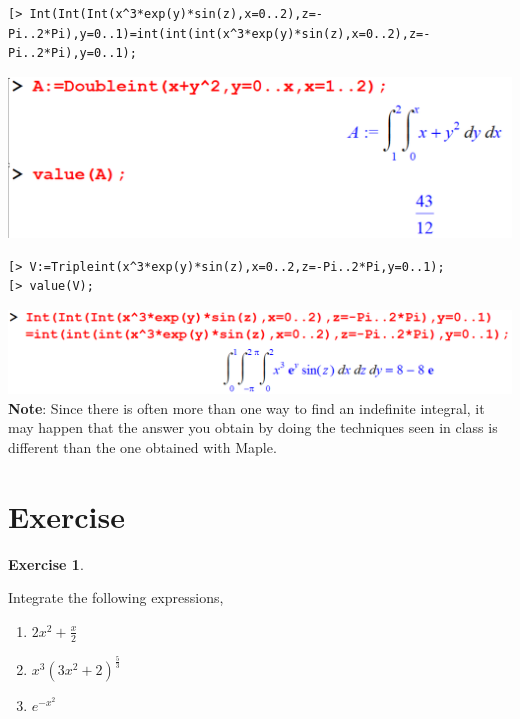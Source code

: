 \documentclass[
]{book}
\providecommand{\tightlist}{%
  \setlength{\itemsep}{0pt}\setlength{\parskip}{0pt}}
\theoremstyle{definition}
\theoremstyle{definition}
\theoremstyle{definition}
\newtheorem{exercise}{Exercise}[chapter]
\theoremstyle{definition}
\theoremstyle{remark}
\begin{document}
\begin{verbatim}
[> Int(Int(Int(x^3*exp(y)*sin(z),x=0..2),z=-Pi..2*Pi),y=0..1)=int(int(int(x^3*exp(y)*sin(z),x=0..2),z=-Pi..2*Pi),y=0..1);
\end{verbatim}

\includegraphics{figures/Lesson 6/fig25.png}

\begin{verbatim}
[> V:=Tripleint(x^3*exp(y)*sin(z),x=0..2,z=-Pi..2*Pi,y=0..1);
[> value(V);
\end{verbatim}

\includegraphics{figures/Lesson 6/fig26.png}
\textbf{Note}: Since there is often more than one way to find an indefinite integral, it may happen that the answer you obtain by doing the techniques seen in class is different than the one obtained with Maple.

\section{Exercise}\label{exercise-4}

\begin{exercise}
\protect\hypertarget{exr:unnamed-chunk-25}{}\label{exr:unnamed-chunk-25}

Integrate the following expressions,

\begin{enumerate}
\def\labelenumi{\roman{enumi}.}
\tightlist
\item
  \(2x^2 + \frac{x}{2}\)
\item
  \(x^3(3x^2 + 2)^{\frac{5}{3}}\)
\item
  \(e^{-x^2}\)
\end{enumerate}

\end{exercise}
\end{document}
